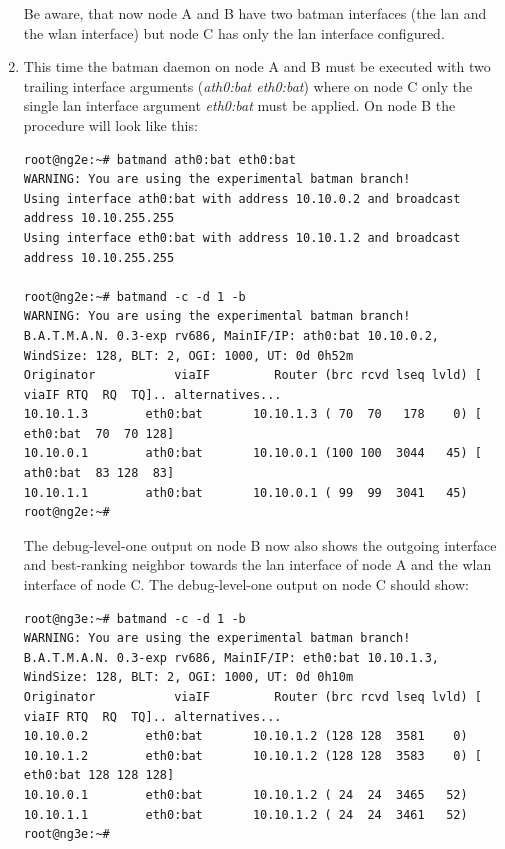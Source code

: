 \documentclass[11pt]{article}
\begin{document}
\begin{enumerate}
Be aware, that now node A and B have two batman interfaces (the lan and the wlan interface) but node C has only the lan interface configured.

\item This time the batman daemon on node A and B must be executed with two trailing interface arguments (\emph{ath0:bat eth0:bat}) where on node C only the single lan interface argument \emph{eth0:bat} must be applied. 
On node B the procedure will look like this:

\begin{small} \begin{verbatim}
root@ng2e:~# batmand ath0:bat eth0:bat
WARNING: You are using the experimental batman branch!
Using interface ath0:bat with address 10.10.0.2 and broadcast address 10.10.255.255
Using interface eth0:bat with address 10.10.1.2 and broadcast address 10.10.255.255

root@ng2e:~# batmand -c -d 1 -b
WARNING: You are using the experimental batman branch!
B.A.T.M.A.N. 0.3-exp rv686, MainIF/IP: ath0:bat 10.10.0.2, WindSize: 128, BLT: 2, OGI: 1000, UT: 0d 0h52m
Originator           viaIF         Router (brc rcvd lseq lvld) [    viaIF RTQ  RQ  TQ].. alternatives...
10.10.1.3        eth0:bat       10.10.1.3 ( 70  70   178    0) [ eth0:bat  70  70 128]
10.10.0.1        ath0:bat       10.10.0.1 (100 100  3044   45) [ ath0:bat  83 128  83]
10.10.1.1        ath0:bat       10.10.0.1 ( 99  99  3041   45)
root@ng2e:~#  
\end{verbatim} \end{small}

The debug-level-one output on node B now also shows the outgoing interface and best-ranking neighbor towards the lan interface of node A and the wlan interface of node C.
The debug-level-one output on node C should show:
\begin{small} \begin{verbatim}
root@ng3e:~# batmand -c -d 1 -b
WARNING: You are using the experimental batman branch!
B.A.T.M.A.N. 0.3-exp rv686, MainIF/IP: eth0:bat 10.10.1.3, WindSize: 128, BLT: 2, OGI: 1000, UT: 0d 0h10m
Originator           viaIF         Router (brc rcvd lseq lvld) [    viaIF RTQ  RQ  TQ].. alternatives...
10.10.0.2        eth0:bat       10.10.1.2 (128 128  3581    0)
10.10.1.2        eth0:bat       10.10.1.2 (128 128  3583    0) [ eth0:bat 128 128 128]
10.10.0.1        eth0:bat       10.10.1.2 ( 24  24  3465   52)
10.10.1.1        eth0:bat       10.10.1.2 ( 24  24  3461   52)
root@ng3e:~#
\end{verbatim} \end{small}


\end{enumerate}
\end{document}

